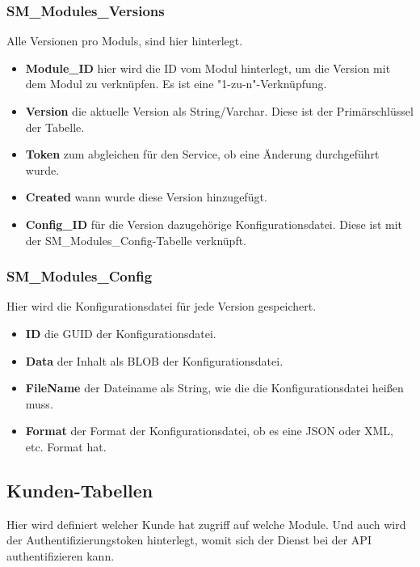\documentclass{article}
\begin{document}
\subsubsection{SM\_Modules\_Versions}

Alle Versionen pro Moduls, sind hier hinterlegt.

\begin{itemize}
  \item \textbf{Module\_ID} hier wird die ID vom Modul hinterlegt, um die Version mit dem Modul zu verknüpfen. Es ist eine "1-zu-n"-Verknüpfung.
  \item \textbf{Version} die aktuelle Version als String/Varchar. Diese ist der Primärschlüssel der Tabelle.
  \item \textbf{Token} zum abgleichen für den Service, ob eine Änderung durchgeführt wurde.
  \item \textbf{Created} wann wurde diese Version hinzugefügt.
  \item \textbf{Config\_ID} für die Version dazugehörige Konfigurationsdatei. Diese ist mit der SM\_Modules\_Config-Tabelle verknüpft. 
\end{itemize}

\subsubsection{SM\_Modules\_Config}

Hier wird die Konfigurationsdatei für jede Version gespeichert.

\begin{itemize}
  \item \textbf{ID} die GUID der Konfigurationsdatei.
  \item \textbf{Data} der Inhalt als BLOB der Konfigurationsdatei.
  \item \textbf{FileName} der Dateiname als String, wie die die Konfigurationsdatei heißen muss.
  \item \textbf{Format} der Format der Konfigurationsdatei, ob es eine JSON oder XML, etc. Format hat.
\end{itemize}

\subsection{Kunden-Tabellen}

Hier wird definiert welcher Kunde hat zugriff auf welche Module.
Und auch wird der Authentifizierungstoken hinterlegt, womit sich der Dienst bei der API authentifizieren kann.
\end{document}
